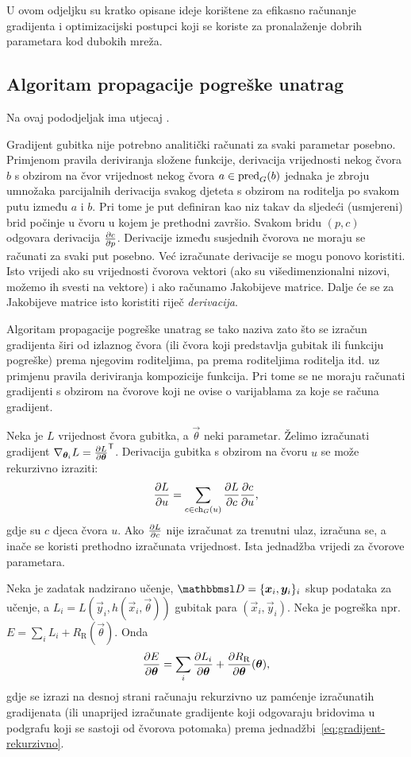 \documentclass[utf8, diplomski, lmodern]{fer}
\begin{document}
U ovom odjeljku su kratko opisane ideje korištene za efikasno računanje gradijenta i optimizacijski postupci koji se koriste za pronalaženje dobrih parametara kod dubokih mreža.

\subsection{Algoritam propagacije pogreške unatrag}

Na ovaj pododjeljak ima utjecaj \cite{Olah:2015:CCGB}.

Gradijent gubitka nije potrebno analitički računati za svaki parametar posebno. Primjenom pravila deriviranja složene funkcije, derivacija vrijednosti nekog čvora $b$ s obzirom na čvor vrijednost nekog čvora $a\in\mathrm{pred}_G(b)$ jednaka je zbroju umnožaka parcijalnih derivacija svakog djeteta s obzirom na roditelja po svakom putu između $a$ i $b$. Pri tome je put definiran kao niz takav da sljedeći (usmjereni) brid počinje u čvoru u kojem je prethodni završio. Svakom bridu $(p,c)$ odgovara derivacija $\pd{c}{p}$. Derivacije između susjednih čvorova ne moraju se računati za svaki put posebno. Već izračunate derivacije se mogu ponovo koristiti. Isto vrijedi ako su vrijednosti čvorova vektori (ako su višedimenzionalni nizovi, možemo ih svesti na vektore) i ako računamo Jakobijeve matrice. Dalje će se za Jakobijeve matrice isto koristiti riječ \textit{derivacija}.

Algoritam propagacije pogreške unatrag se tako naziva zato što se izračun gradijenta širi od izlaznog čvora (ili čvora koji predstavlja gubitak ili funkciju pogreške) prema njegovim roditeljima, pa prema roditeljima roditelja itd. uz primjenu pravila deriviranja kompozicije funkcija. Pri tome se ne moraju računati gradijenti s obzirom na čvorove koji ne ovise o varijablama za koje se računa gradijent.

Neka je $L$ vrijednost čvora gubitka, a $\vec\theta$ neki parametar. Želimo izračunati gradijent $\nabla_{\vec\theta_i}L=\pd{L}{\vec\theta}^\tp$. Derivacija gubitka s obzirom na čvoru $u$ se može rekurzivno izraziti: 
\begin{align} \label{eq:gradijent-rekurzivno}
\pd{L}{u} = \sum_{c\in\ch_G(u)} \pd{L}{c}\pd{c}{u}	\text{,}
\end{align}
gdje su $c$ djeca čvora $u$. Ako $\pd{L}{c}$ nije izračunat za trenutni ulaz, izračuna se, a inače se koristi prethodno izračunata vrijednost. Ista jednadžba vrijedi za čvorove parametara.

Neka je zadatak nadzirano učenje, $\set D=\cbr{\vec x_i, \vec y_i}_i$ skup podataka za učenje, a $L_i=L(\vec y_i, h(\vec x_i,\vec \theta))$ gubitak para $(\vec x_i, \vec y_i)$. Neka je pogreška npr. $E=\sum_i L_i + R_\text{R}(\vec\theta)$. Onda
\begin{align}
\pd{E}{\vec\theta} 
= \sum_{i} \pd{L_i}{\vec\theta} + \pd{R_\text{R}}{\vec\theta}\del{\vec\theta} \text{,}
\end{align}
gdje se izrazi na desnoj strani računaju rekurzivno uz pamćenje izračunatih gradijenata (ili unaprijed izračunate gradijente koji odgovaraju bridovima u podgrafu koji se sastoji od čvorova potomaka) prema jednadžbi~\ref{eq:gradijent-rekurzivno}.
\end{document}
